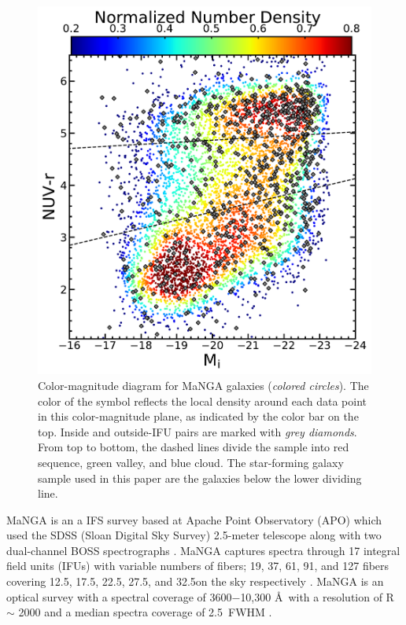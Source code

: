 \documentclass[iop,revtex4,twocolumn,apj,numberedappendix,appendixfloats]{emulateapj}
\begin{document}
\begin{figure}
\centering
\includegraphics[width=\linewidth]{fig/color-mag.pdf}
\caption[]{Color-magnitude diagram for MaNGA galaxies ({\it colored circles}). The color of the symbol reflects the local density around each data point in this color-magnitude plane, as indicated by the color bar on the top. Inside and outside-IFU pairs are marked with {\it grey diamonds}. From top to bottom, the dashed lines divide the sample into red sequence, green valley, and blue cloud. The star-forming galaxy sample used in this paper are the galaxies below the lower dividing line.}
\label{fig:cmd}
\end{figure}

MaNGA is an a IFS survey based at Apache Point Observatory (APO) which used the SDSS (Sloan Digital Sky Survey) 2.5-meter telescope along with two dual-channel BOSS spectrographs \citep{Drory:2015}. MaNGA captures spectra through 17 integral field units (IFUs) with variable numbers of fibers; 19, 37, 61, 91, and 127 fibers covering 12.5\arcsec, 17.5\arcsec, 22.5\arcsec, 27.5\arcsec, and 32.5\arcsec on the sky respectively \citet{Law:2015}. MaNGA is an optical survey with a spectral coverage of 3600$-$10,300 \AA\ with a resolution of R $\sim$ 2000 and a median spectra coverage of 2.5\arcsec\ FWHM \citep{Bundy:2015}. 
\end{document}
